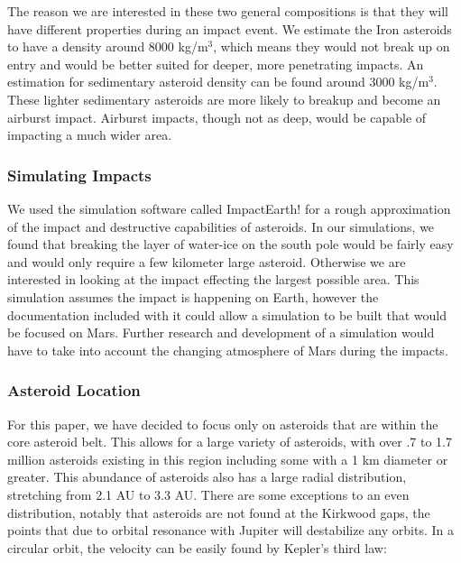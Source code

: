 \documentclass[a4paper]{article}
\begin{document}
  The reason we are interested in these two general compositions is that they will have different properties during an impact event. We estimate the Iron asteroids to have a density around 8000 kg/m$^3$, which means they would not break up on entry and would be better suited for deeper, more penetrating impacts. An estimation for sedimentary asteroid density can be found around 3000 kg/m$^3$. \cite{gareth_s._collins_earth_2005} These lighter sedimentary asteroids are more likely to breakup and become an airburst impact. Airburst impacts, though not as deep, would be capable of impacting a much wider area.
  
  \subsubsection{Simulating Impacts}
  We used the simulation software called ImpactEarth! \cite{itap_for_purdue_university_impact_????} for a rough approximation of the impact and destructive capabilities of asteroids. In our simulations, we found that breaking the layer of water-ice on the south pole would be fairly easy and would only require a few kilometer large asteroid. Otherwise we are interested in looking at the impact effecting the largest possible area. This simulation assumes the impact is happening on Earth, however the documentation included with it could allow a simulation to be built that would be focused on Mars. Further research and development of a simulation would have to take into account the changing atmosphere of Mars during the impacts\cite{gareth_s._collins_earth_2005}. 

  \subsubsection{Asteroid Location}

  For this paper, we have decided to focus only on asteroids that are within the core asteroid belt. This allows for a large variety of asteroids, with over .7 to 1.7 million asteroids existing in this region including some with a 1 km diameter or greater. This abundance of asteroids also has a large radial distribution, stretching from 2.1 AU to 3.3 AU. There are some exceptions to an even distribution, notably that asteroids are not found at the Kirkwood gaps, the points that due to orbital resonance with Jupiter will destabilize any orbits. \cite{edward_f._tedesco_infrared_2002} In a circular orbit, the velocity can be easily found by Kepler's third law:
  
\end{document}
